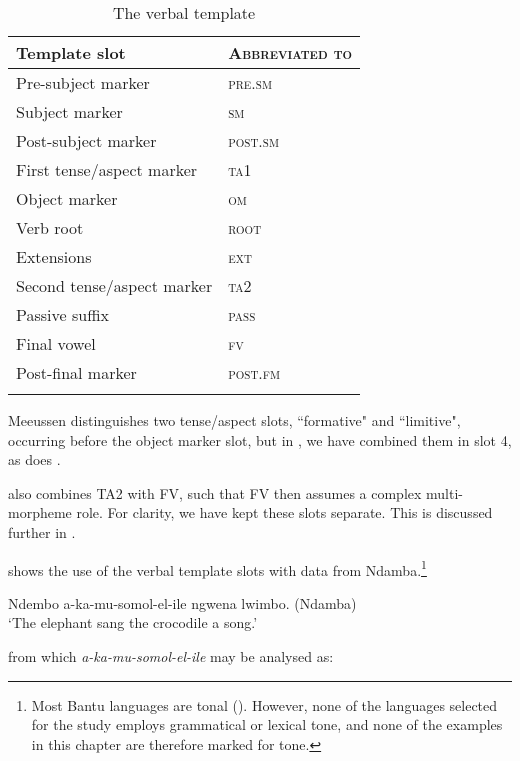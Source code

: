 \documentclass[output=paper,
            colorlinks, citecolor=brown
            ,draftmode
		  ]{langscibook}
\begin{document}
\begin{table}

\begin{tabular}{l>{\scshape}l} 
\lsptoprule
 {Template slot} & {\normalfont Abbreviated to}\\
\midrule
Pre-subject marker         & pre.sm\\
 Subject marker            & sm\\
 Post-subject marker       & post.sm\\
 First tense/aspect marker & ta1\\
 Object marker             & om\\
 Verb root                 & root\\
 Extensions                & ext\\
Second tense/aspect marker & ta2\\
 Passive suffix            & pass\\
 Final vowel               & fv\\
Post-final marker          & post.fm\\
\lspbottomrule
\end{tabular}
\caption{The verbal template}
\label{tab:petzell:1}
\end{table}

Meeussen distinguishes two tense/aspect slots, ``formative" and ``limitive", occurring before the object marker slot, but in , we have combined them in slot 4, as does \citet[40]{Nurse2008}.



\citet[40]{Nurse2008} also combines TA2 with FV, such that FV then assumes a complex multi-morpheme role. For clarity, we have kept these slots separate. This is discussed further in .



 shows the use of the verbal template slots with data from Ndamba.\footnote{ Most Bantu languages are tonal (\citealt{MarloOdden2019}). However, none of the languages selected for the study employs grammatical or lexical tone, and none of the examples in this chapter are therefore marked for tone.}


\ea\label{ex:petzell:1}Ndembo a-ka-mu-somol-el-ile ngwena lwimbo.    \hfill      {(Ndamba)}\\
`The elephant sang the crocodile a song.'
\z





from which \textit{a-ka-mu-somol-el-ile} may be analysed as:
\end{document}

